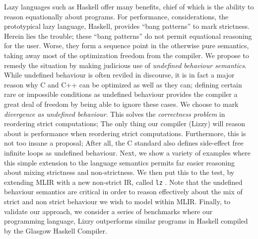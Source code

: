 \documentclass[sigplan,\review anonymous]{acmart}
\newcommand{\lz}{\texttt{lz} }
\begin{document}
Lazy languages such as Haskell
offer many benefits, chief of which is the ability to reason
equationally about programs. For performance, considerations,
the prototypical lazy language, Haskell, provides ``bang patterns'' to
mark strictness. Herein lies the trouble; these ``bang patterns'' do not
permit equational reasoning for the user. Worse, they form a sequence point
in the otherwise pure semantics, taking away most of the optimization freedom
from the compiler. We propose to remedy the situation by making judicious use
of \emph{undefined behaviour semantics}. While undefined behaviour is often
reviled in discourse, it is in fact a major reason why C and C++ can be optimized
as well as they can; defining certain rare or impossible conditions as undefined
behaviour provides the compiler a great deal of freedom by being able to ignore
these cases. We choose to mark \emph{divergence as undefined behaviour}. This
solves the \emph{correctness problem} in reordering strict computations; The
only thing our compiler (Lizzy) will reason about is performance when reordering
strict computations. Furthermore, this is not too insane a proposal; After all,
the C standard also defines side-effect free infinite loops as undefined behaviour.
Next, we show a variety of examples where this simple extension to the language
semantics permits far easier reasoning about mixing strictness and non-strictness.
We then put this to the test, by extending MLIR with a new non-strict IR, called
\lz. Note that the undefined behaviour semantics are critical in order to
reason effectively about the mix of strict and non strict behaviour we wish
to model within MLIR. Finally, to validate our approach, we consider a series
of benchmarks where our programming language, Lizzy outperforms similar programs
in Haskell compiled by the Glasgow Haskell Compiler.

                                                                   
\end{document}
